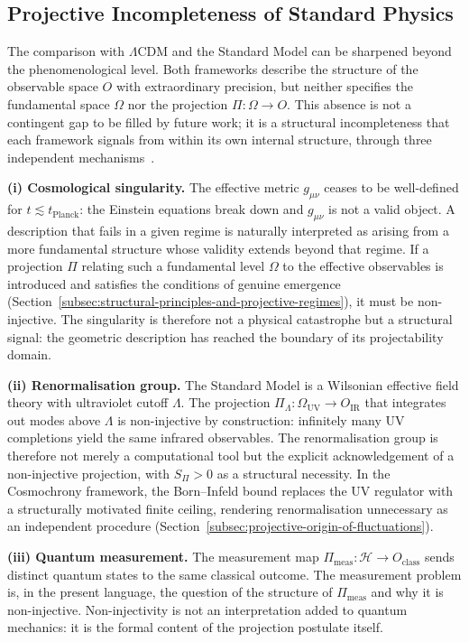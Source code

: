 \subsection{Projective Incompleteness of Standard Physics}
  \label{subsec:projective-incompleteness-standard-physics}

  The comparison with $\Lambda$CDM and the Standard Model can be sharpened
  beyond the phenomenological level.
  Both frameworks describe the structure of the observable space $O$ with
  extraordinary precision, but neither specifies the fundamental space $\Omega$
  nor the projection $\Pi : \Omega \to O$.
  This absence is not a contingent gap to be filled by future work; it is a
  structural incompleteness that each framework signals from within its own
  internal structure, through three independent mechanisms~\cite{Beau2026l}.

  \textbf{(i) Cosmological singularity.}
  The effective metric $g_{\mu\nu}$ ceases to be well-defined for
  $t \lesssim t_{\mathrm{Planck}}$: the Einstein equations break down
  and $g_{\mu\nu}$ is not a valid object.
  A description that fails in a given regime is naturally interpreted as
  arising from a more fundamental structure whose validity extends beyond
  that regime.
  If a projection $\Pi$ relating such a fundamental level $\Omega$ to the
  effective observables is introduced and satisfies the conditions of
  genuine emergence (Section~\ref{subsec:structural-principles-and-projective-regimes}),
  it must be non-injective.
  The singularity is therefore not a physical catastrophe but a structural
  signal: the geometric description has reached the boundary of its
  projectability domain.

  \textbf{(ii) Renormalisation group.}
  The Standard Model is a Wilsonian effective field theory with ultraviolet
  cutoff $\Lambda$.
  The projection $\Pi_\Lambda : \Omega_{\mathrm{UV}} \to O_{\mathrm{IR}}$
  that integrates out modes above $\Lambda$ is non-injective by construction:
  infinitely many UV completions yield the same infrared observables.
  The renormalisation group is therefore not merely a computational tool but
  the explicit acknowledgement of a non-injective projection, with $S_\Pi > 0$
  as a structural necessity.
  In the Cosmochrony framework, the Born--Infeld bound replaces the
  UV regulator with a structurally motivated finite ceiling, rendering
  renormalisation unnecessary as an independent procedure
  (Section~\ref{subsec:projective-origin-of-fluctuations}).

  \textbf{(iii) Quantum measurement.}
  The measurement map $\Pi_{\mathrm{meas}} : \mathcal{H} \to O_{\mathrm{class}}$
  sends distinct quantum states to the same classical outcome.
  The measurement problem is, in the present language, the question of the
  structure of $\Pi_{\mathrm{meas}}$ and why it is non-injective.
  Non-injectivity is not an interpretation added to quantum mechanics: it is
  the formal content of the projection postulate itself.

